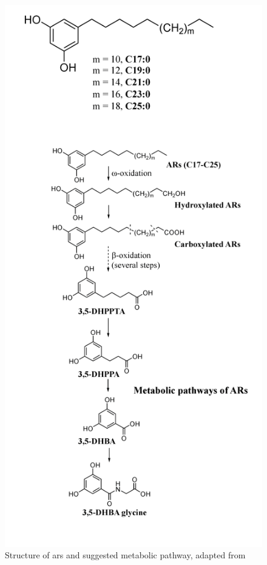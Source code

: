 \begin{figure}[h!]
	\centering
	\includegraphics[width=0.5\linewidth]{picture/ars_sang_pathway}
	\caption{Structure of \acrshort{ars} and suggested metabolic pathway, adapted from \cite{ISI:000447355100002}}
	\label{fig:structure_ars}
\end{figure}

